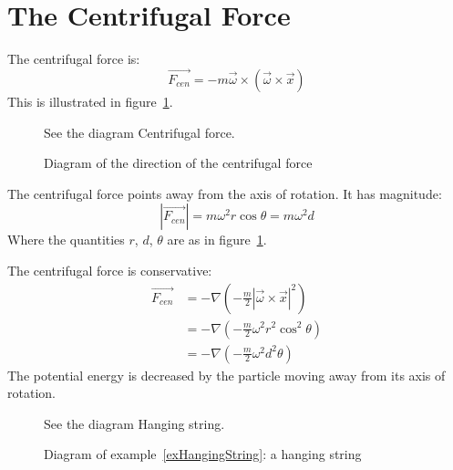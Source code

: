 \documentclass[../Main.tex]{subfiles}
\begin{document}
\section{The Centrifugal Force}
The centrifugal force is:
\begin{equation}
    \vec{F_{cen}} = -m \vec{\omega} \times (\vec{\omega} \times \vec{x})
    \label{eqnCentrifugal}
\end{equation}
This is illustrated in figure~\ref{figCentrifugal}.
\begin{figure}[ht]
    \centering
    See the diagram Centrifugal force. %
    \caption{Diagram of the direction of the centrifugal force}
    \label{figCentrifugal}
\end{figure}
The centrifugal force points away from the axis of rotation. It has magnitude:
\begin{equation*}
    |\vec{F_{cen}}| = m\omega^2 r \cos{\theta} = m\omega^2d
\end{equation*}
Where the quantities $r$, $d$, $\theta$ are as in figure~\ref{figCentrifugal}.\par
The centrifugal force is conservative:
\begin{align*}
    \vec{F_{cen}} &= -\nabla\left(-\frac{m}{2}|\vec{\omega} \times \vec{x}|^2\right) \\
    &= -\nabla\left(-\frac{m}{2}\omega^2r^2\cos^2\theta\right) \\
    &= -\nabla\left(-\frac{m}{2}\omega^2d^2\theta\right)
\end{align*}
The potential energy is decreased by the particle moving away from its axis of rotation.
\begin{figure}[ht]
    \centering
    See the diagram Hanging string. %
    \caption{Diagram of example~\ref{exHangingString}: a hanging string}
    \label{figHangingString}
\end{figure}
\end{document}
